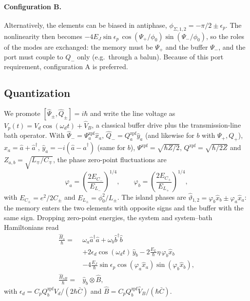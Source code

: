 \documentclass[aps,prx,reprint,floatfix,amsmath,amssymb,longbibliography]{revtex4-2}
\begin{document}
\paragraph{Configuration B.}
Alternatively, the elements can be biased in antiphase,
$\phi_{\Sigma,1,2}=-\pi/2\pm\epsilon_p$. The
nonlinearity then becomes
$-4E_J\sin\epsilon_p\,\cos(\Psi_+/\phi_0)\sin(\Psi_-/\phi_0)$, so the roles
of the modes are exchanged: the memory must be $\Psi_+$ and the buffer
$\Psi_-$, and the port must couple to $Q_-$ only (e.g.\ through a balun).
Because of this port requirement, configuration A is preferred.

\subsection{Quantization}
\label{app:quantization}

We promote $[\hat{\Psi}_\pm,\hat{Q}_\pm]=i\hbar$ and write the line
voltage as $V_p(t)=V_d\cos(\omega_dt)+\hat{V}_B$, a classical buffer drive
plus the transmission-line bath operator. With
$\hat{\Psi}_-=\Psi_a^{\mathrm{zpf}}\hat{x}_a$,
$\hat{Q}_-=Q_a^{\mathrm{zpf}}\hat{y}_a$ (and likewise for $b$ with
$\Psi_+,Q_+$), $\hat{x}_a=\hat{a}+\hat{a}^\dagger$,
$\hat{y}_a=-i(\hat{a}-\hat{a}^\dagger)$ (same for $b$),
$\Psi^{\mathrm{zpf}}=\sqrt{\hbar Z/2}$, $Q^{\mathrm{zpf}}=\sqrt{\hbar/2Z}$
and $Z_{a,b}=\sqrt{L_\mp/C_\mp}$, the phase zero-point fluctuations are
\begin{equation}
  \varphi_a=\left(\frac{2E_{C_-}}{E_{L_-}}\right)^{1/4},\qquad
  \varphi_b=\left(\frac{2E_{C_+}}{E_{L_+}}\right)^{1/4},
\end{equation}
with $E_{C_\pm}=e^2/2C_\pm$ and $E_{L_\pm}=\phi_0^2/L_\pm$. The island
phases are $\hat{\vartheta}_{1,2}=\varphi_b\hat{x}_b\pm\varphi_a\hat{x}_a$:
the memory enters the two elements with opposite signs and the buffer
with the same sign. Dropping zero-point energies, the system and
system--bath Hamiltonians read
\begin{equation}
\begin{aligned}
  \frac{\hat{H}_s}{\hbar}={}&\omega_a\hat{a}^\dagger\hat{a}
  +\omega_b\hat{b}^\dagger\hat{b}\\
  &+2\epsilon_d\cos(\omega_dt)\,\hat{y}_b
  -2\frac{E_L}{\hbar}\eta\,\varphi_b\hat{x}_b\\
  &-4\frac{E_J}{\hbar}\sin\epsilon_p
  \cos(\varphi_a\hat{x}_a)\sin(\varphi_b\hat{x}_b),\\
  \frac{\hat{H}_{sB}}{\hbar}={}&\hat{y}_b\otimes\hat{B},
\end{aligned}
\label{eq:app_Hq}
\end{equation}
with $\epsilon_d=C_pQ_b^{\mathrm{zpf}}V_d/(2\hbar\bar{C})$ and
$\hat{B}=C_pQ_b^{\mathrm{zpf}}\hat{V}_B/(\hbar\bar{C})$.
\end{document}
